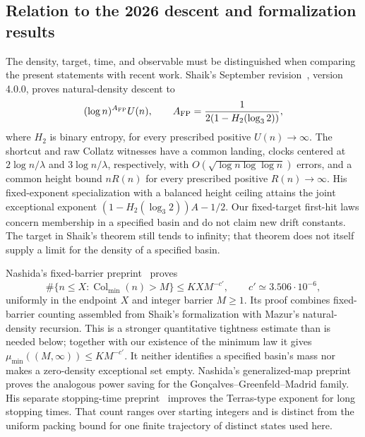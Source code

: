\documentclass[11pt,a4paper]{article}
\begin{document}
\subsection{Relation to the 2026 descent and formalization results}

The density, target, time, and observable must be distinguished when
comparing the present statements with recent work. Shaik's September
revision~\cite{Shaik2026}, version 4.0.0, proves natural-density descent
to
\[
 (\log n)^{A_{\rm FP}}U(n),\qquad
 A_{\rm FP}=\frac1{2(1-H_2(\log_3 2))},
\]
where \(H_2\) is binary entropy, for every prescribed positive
\(U(n)\to\infty\). The shortcut and raw
Collatz witnesses have a common landing, clocks centered at
\(2\log n/\lambda\) and \(3\log n/\lambda\), respectively, with
\(O(\sqrt{\log n\log\log n})\) errors, and a common height bound
\(nR(n)\) for every prescribed positive \(R(n)\to\infty\).
His fixed-exponent specialization with a balanced height ceiling attains
the joint exceptional exponent
\((1-H_2(\log_3 2))A-1/2\). Our fixed-target first-hit laws concern
membership in a specified basin and do not claim new drift constants.
The target in Shaik's theorem still tends to infinity; that theorem
does not itself supply a limit for the density of a specified basin.

Nashida's fixed-barrier preprint~\cite{NashidaBarrier2026} proves
\[
 \#\{n\le X:\operatorname{Col}_{\min}(n)>M\}
       \le KXM^{-c'},\qquad c'\simeq3.506\cdot10^{-6},
\]
uniformly in the endpoint \(X\) and integer barrier \(M\ge1\).
Its proof combines fixed-barrier counting assembled from Shaik's
formalization with Mazur's natural-density recursion. This is a
stronger quantitative tightness estimate than is needed below;
together with our existence of the minimum law it gives
\(\mu_{\min}((M,\infty))\le KM^{-c'}\).
It neither identifies a specified basin's mass nor makes a zero-density
exceptional set empty. Nashida's generalized-map
preprint~\cite{NashidaGeneral2026} proves the analogous power saving
for the Gon\c calves--Greenfeld--Madrid family. His separate
stopping-time preprint~\cite{NashidaTerras2026} improves the
Terras-type exponent for long stopping times. That count ranges over
starting integers and is distinct from the uniform packing bound for
one finite trajectory of distinct states used here.
\end{document}

